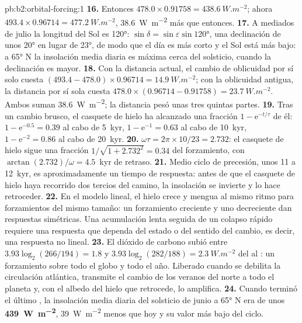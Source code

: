 \begin{solution}{pb:b2:orbital-forcing:1}
\textbf{16.} Entonces $478.0 \times 0.91758 = \qty{438.6}{W.m^{-2}}$; ahora $493.4 \times 0.96714 =
\qty{477.2}{W.m^{-2}}$, \qty{38.6}{W.m^{-2}} más que entonces.
\textbf{17.} A mediados de julio la longitud del Sol es \ang{120}: $\sin\delta = \sin\varepsilon\sin\ang{120}$,
una declinación de unos \ang{20} en lugar de \ang{23}, de modo que el día es más corto y el Sol está más bajo: a
\ang{65} N la insolación media diaria es máxima cerca del solsticio, cuando la declinación es mayor.
\textbf{18.} Con la distancia actual, el cambio de oblicuidad por sí solo cuesta $(493.4 - 478.0) \times
0.96714 = \qty{14.9}{W.m^{-2}}$; con la oblicuidad antigua, la distancia por sí sola cuesta $478.0 \times
(0.96714 - 0.91758) = \qty{23.7}{W.m^{-2}}$. Ambos suman \qty{38.6}{W.m^{-2}}; la distancia
pesó unas tres quintas partes.
\textbf{19.} Tras un cambio brusco, el casquete de hielo ha alcanzado una fracción $1 - \mathrm e^{-t/\tau}$ de él:
$1 - \mathrm e^{-0.5} = 0.39$ al cabo de \qty{5}{kyr}, $1 - \mathrm e^{-1} = 0.63$ al cabo de \qty{10}{kyr},
$1 - \mathrm e^{-2} = 0.86$ al cabo de \qty{20}{kyr}.
\textbf{20.} $\omega\tau = 2\pi \times 10/23 = 2.732$: el casquete de hielo sigue una fracción $1/\sqrt{1 + 2.732^2} =
0.34$ del forzamiento, con $\arctan(2.732)/\omega = 4.5$~kyr de retraso.
\textbf{21.} Medio ciclo de precesión, unos 11 a \qty{12}{kyr}, es aproximadamente un tiempo de respuesta: antes de que
el casquete de hielo haya recorrido dos tercios del camino, la insolación se invierte y lo hace retroceder.
\textbf{22.} En el modelo lineal, el hielo crece y mengua al mismo ritmo para forzamientos del mismo
tamaño: un forzamiento creciente y uno decreciente dan respuestas simétricas. Una acumulación lenta seguida de un
colapso rápido requiere una respuesta que dependa del estado o del sentido del cambio, es decir,
una respuesta no lineal.
\textbf{23.} El dióxido de carbono subió entre $3.93\log_2(266/194) = 1.8$ y $3.93\log_2(282/188) =
\qty{2.3}{W.m^{-2}}$ del  al : un forzamiento sobre todo el globo y todo el
año. Liberado cuando se debilita la circulación atlántica, transmite el cambio de los veranos
del norte a todo el planeta y, con el albedo del hielo que retrocede, lo amplifica.
\textbf{24.} Cuando terminó el último , la insolación media diaria del solsticio de junio a
\ang{65} N era de unos \textbf{\qty{439}{W.m^{-2}}}, \qty{39}{W.m^{-2}} menos que hoy y su valor más
bajo del ciclo.
\end{solution}
